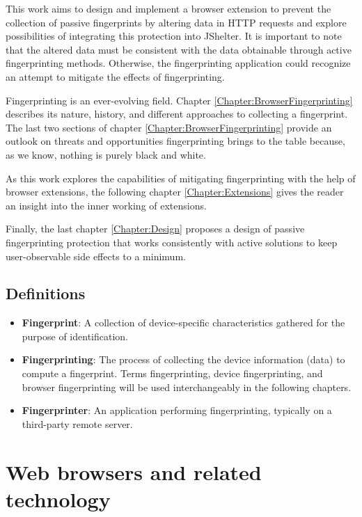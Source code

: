 This work aims to design and implement a browser extension to prevent the collection of passive fingerprints by altering data in HTTP requests and explore possibilities of integrating this protection into JShelter. It is important to note that the altered data must be consistent with the data obtainable through active fingerprinting methods. Otherwise, the fingerprinting application could recognize an attempt to mitigate the effects of fingerprinting.

Fingerprinting is an ever-evolving field. Chapter \ref{Chapter:BrowserFingerprinting} describes its nature, history, and different approaches to collecting a fingerprint. The last two sections of chapter \ref{Chapter:BrowserFingerprinting} provide an outlook on threats and opportunities fingerprinting brings to the table because, as we know, nothing is purely black and white.

As this work explores the capabilities of mitigating fingerprinting with the help of browser extensions, the following chapter \ref{Chapter:Extensions} gives the reader an insight into the inner working of extensions.

Finally, the last chapter \ref{Chapter:Design} proposes a design of passive fingerprinting protection that works consistently with active solutions to keep user-observable side effects to a minimum.

\section{Definitions}

\begin{itemize}
	\item \textbf{Fingerprint}: A collection of device-specific characteristics gathered for the purpose of identification.
	\item \textbf{Fingerprinting}: The process of collecting the device information (data) to compute a fingerprint. Terms fingerprinting, device fingerprinting, and browser fingerprinting will be used interchangeably in the following chapters.
	\item \textbf{Fingerprinter}: An application performing fingerprinting, typically on a third-party remote server.
\end{itemize}


\chapter{Web browsers and related technology}

